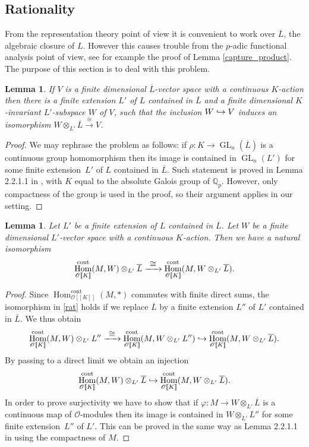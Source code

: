 \documentclass[11pt]{article}
\let\mathcal\mathscr
\newcommand{\To}[1]{\mathchoice{\xrightarrow{\textstyle\kern4pt#1\kern3pt}}{\stackrel{#1}{\longrightarrow}}{}{}}
\newcommand\hto{\mathrel{\lhook\joinrel\to}}
\newtheorem{lem}[prop]{Lemma}
\theoremstyle{definition}
\DeclareMathOperator{\Hom}{Hom}
\DeclareMathOperator{\GL}{GL}
\newcommand{\br}[1]{[\![#1]\!]}
\newcommand{\Qp}{\mathbb {Q}_p}
\newcommand{\cO}{\mathcal{O}}
\newcommand{\cont}{\mathrm{cont}}
\newcommand{\Lbar}{\overline{L}}
\begin{document}
\subsection{Rationality} From the representation theory point of view it is convenient to work over $\Lbar$, the algebraic closure of $L$. However this causes trouble from the $p$\nobreakdash-adic functional analysis point of view, see for example the proof
of Lemma \ref{capture_product}. The purpose of this section is to deal with this problem.

\begin{lem}\label{finite_structure} If $V$ is a finite dimensional $\Lbar$-vector space with a continuous $K$\nobreakdash-action then there
is a finite extension $L'$ of $L$ contained in $\Lbar$ and a finite dimensional $K$\nobreakdash-in\-variant $L'$-subspace $W$ of $V$,
such that the inclusion $W\hto V$ induces an isomorphism $W\otimes_{L'} \Lbar\overset{\cong}{\longrightarrow} V$.
\end{lem}

\begin{proof} We may rephrase the problem as follows: if $\rho: K \to \GL_n(\Lbar)$ is a continuous group
homomorphism then its image is contained in $\GL_n(L')$ for some finite extension~$L'$ of $L$ contained in $\Lbar$.
Such statement is proved in Lemma 2.2.1.1 in \cite{bm1}, with $K$ equal to the absolute Galois group of $\Qp$. However,
only compactness of the group is used in the proof, so their argument applies in our setting.
\end{proof}

\begin{lem}\label{homs_the_same} Let $L'$ be a finite extension of $L$ contained in $\Lbar$. Let $W$ be a finite dimensional $L'$-vector
space with a continuous $K$-action. Then we have a natural isomorphism
\begin{equation}\label{rat}
\Hom_{\cO\br{K}}^{\cont}(M, W)\otimes_{L'} \Lbar \To{\cong}\Hom_{\cO\br{K}}^{\cont}(M, W\otimes_{L'}\Lbar).
\end{equation}
\end{lem}

\begin{proof} Since $\Hom_{\cO\br{K}}^{\cont}(M, \ast)$ commutes with finite direct sums, the isomorphism in \eqref{rat} holds if we replace $\Lbar$ by a finite extension $L''$ of $L'$ contained in $\Lbar$. We thus obtain
\[
\Hom_{\cO\br{K}}^{\cont}(M, W)\otimes_{L'} L'' \To{\cong}\Hom_{\cO\br{K}}^{\cont}(M, W\otimes_{L'} L'')
\hto \Hom_{\cO\br{K}}^{\cont}(M, W\otimes_{L'} \Lbar).
\]
By passing to a direct limit we obtain an injection
\[
\Hom_{\cO\br{K}}^{\cont}(M, W)\otimes_{L'} \Lbar \hto \Hom_{\cO\br{K}}^{\cont}(M, W\otimes_{L'} \Lbar).
\]
In order to prove surjectivity we have to show that if $\varphi: M\to W\otimes_{L'}\Lbar$ is a continuous map of
$\cO$-modules then its image is contained in $W\otimes_{L'}L''$ for some finite extension~$L''$ of $L'$. This can be proved in the same way as Lemma 2.2.1.1 in \cite{bm1}
using the compactness of $M$.
\end{proof}
\end{document}
